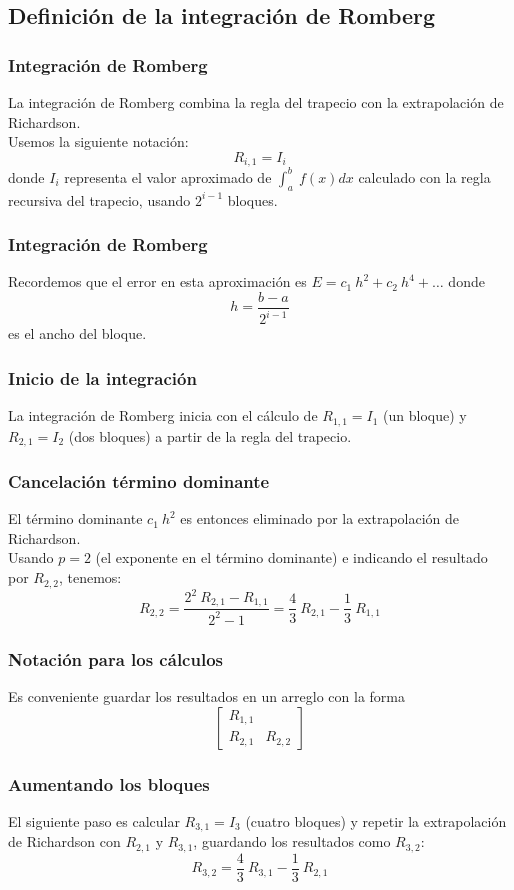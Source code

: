 \subsection{Definición de la integración de Romberg}
\begin{frame}
\frametitle{Integración de Romberg}
La integración de Romberg combina la regla del trapecio con la extrapolación de Richardson. 
\\
\bigskip
Usemos la siguiente notación:
\[ R_{i, 1} = I_{i} \]
donde $I_{i}$ representa el valor aproximado de $\int_{a}^{b} \: f(x)dx$ calculado con la regla recursiva del trapecio, usando $2^{i - 1}$ bloques.
\end{frame}
\begin{frame}
\frametitle{Integración de Romberg}
Recordemos que el error en esta aproximación es $E = c_{1} \: h^{2} + c_{2} \: h^{4} + \ldots$ donde
\[ h = \dfrac{b - a}{2^{i - 1}} \]
es el ancho del bloque.
\end{frame}
\begin{frame}
\frametitle{Inicio de la integración}
La integración de Romberg inicia con el cálculo de $R_{1, 1} = I_{1}$ (un bloque) y $R_{2, 1} = I_{2}$ (dos bloques) a partir de la regla del trapecio.
\end{frame}
\begin{frame}
\frametitle{Cancelación término dominante}
El término dominante $c_{1} \: h^{2}$ es entonces eliminado por la extrapolación de Richardson.
\\
\bigskip
Usando $p = 2$ (el exponente en el término dominante) e indicando el resultado por $R_{2, 2}$, tenemos:
\[ R_{2, 2} = \dfrac{2^{2} \: R_{2, 1} - R_{1, 1}}{2^{2} - 1} = \dfrac{4}{3} \: R_{2, 1} - \dfrac{1}{3} \: R_{1, 1} \]
\end{frame}
\begin{frame}
\frametitle{Notación para los cálculos}
Es conveniente guardar los resultados en un arreglo con la forma
\[ \begin{bmatrix}
R_{1, 1} & \\
R_{2, 1} & R_{2, 2}
\end{bmatrix} \]
\end{frame}
\begin{frame}
\frametitle{Aumentando los bloques}
El siguiente paso es calcular $R_{3, 1}= I_{3}$ (cuatro bloques) y repetir la extrapolación de Richardson con $R_{2, 1}$ y $R_{3, 1}$, guardando los resultados como $R_{3, 2}$:
\[ R_{3, 2} = \dfrac{4}{3} \: R_{3,1} - \dfrac{1}{3} \: R_{2,1} \]
\end{frame}
